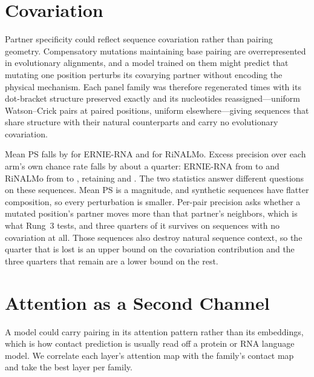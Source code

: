 \documentclass{article}
\begin{document}
\section{Covariation}
\label{sec:covariation}

Partner specificity could reflect sequence covariation rather than pairing
geometry. Compensatory mutations maintaining base pairing are overrepresented in
evolutionary alignments, and a model trained on them might predict that mutating
one position perturbs its covarying partner without encoding the physical
mechanism. Each panel family was therefore regenerated \synPerFamily{} times
with its dot-bracket structure preserved exactly and its nucleotides
reassigned---uniform Watson--Crick pairs at paired positions, uniform
elsewhere---giving \synN{} sequences that share structure with their natural
counterparts and carry no evolutionary covariation.



Mean PS falls by \synPSDropErnieRNA{} for ERNIE-RNA and \synPSDropRiNALMo{} for
RiNALMo. Excess precision over each arm's own chance rate falls by about a
quarter: ERNIE-RNA from \natExcessErnieRNA{} to \synExcessErnieRNA{} and RiNALMo
from \natExcessRiNALMo{} to \synExcessRiNALMo{}, retaining
\synRetainedErnieRNA{} and \synRetainedRiNALMo{}. The two statistics answer
different questions on these sequences. Mean PS is a magnitude, and synthetic
sequences have flatter composition, so every perturbation is smaller. Per-pair
precision asks whether a mutated position's partner moves more than that
partner's neighbors, which is what Rung~3 tests, and three quarters of it
survives on sequences with no covariation at all. Those sequences also destroy
natural sequence context, so the quarter that is lost is an upper bound on the
covariation contribution and the three quarters that remain are a lower bound on
the rest.

\section{Attention as a Second Channel}
\label{sec:attention}

A model could carry pairing in its attention pattern rather than its
embeddings, which is how contact prediction is usually read off a protein or RNA
language model. We correlate each layer's attention map with the family's contact
map and take the best layer per family.


\end{document}
